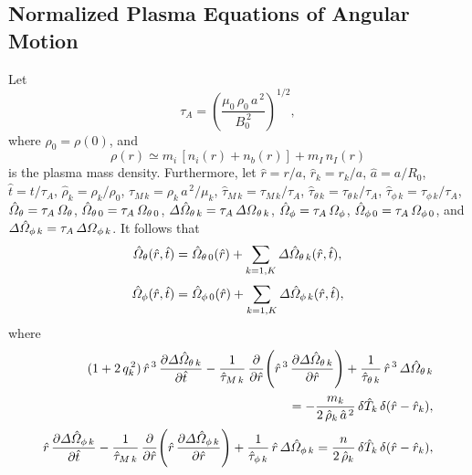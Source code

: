 \documentclass[12pt]{article}
\begin{document}
\subsection{Normalized Plasma Equations of Angular Motion}
Let 
\begin{equation}
\tau_A = \left(\frac{\mu_0\,\rho_0\,a^{\,2}}{B_0^{\,2}}\right)^{1/2},
\end{equation}
where
 $\rho_0=\rho(0)$,
 and
\begin{equation}
\rho(r)
\simeq  m_i\,[n_i(r)+n_b(r)] + m_I\,n_I(r)
\end{equation}
 is the plasma mass density.  
  Furthermore, let $\hat{r}=r/a$, $\hat{r}_k=r_k/a$, $\hat{a}=a/R_0$, $\hat{t}=t/\tau_A$, $\hat{\rho}_k=\rho_k/\rho_0$, $\tau_{M\,k} = \rho_k\,a^{\,2}/\mu_k$, $\hat{\tau}_{M\,k}= \tau_{M\,k}/\tau_A$, 
$\hat{\tau}_{\theta\,k}=\tau_{\theta\,k}/\tau_A$, $
\hat{\tau}_{\phi\,k}=\tau_{\phi\,k}/\tau_A$, $\hat{\mit\Omega}_\theta=\tau_A\,{\mit\Omega}_\theta$, $\hat{\mit\Omega}_{\theta\,0}=\tau_A\,{\mit\Omega}_{\theta\,0}$,
${\mit\Delta}\hat{\mit\Omega}_{\theta\,k} = \tau_A\,{\mit\Delta\Omega}_{\theta\,k}$, $\hat{\mit\Omega}_\phi=\tau_A\,{\mit\Omega}_\phi$, $\hat{\mit\Omega}_{\phi\,0}=\tau_A\,{\mit\Omega}_{\phi\,0}$,
and 
${\mit\Delta}\hat{\mit\Omega}_{\phi\,k} = \tau_A\,{\mit\Delta\Omega}_{\phi\,k}$. It follows that
\begin{align}
\hat{\mit\Omega}_\theta(\hat{r},\hat{t}) &=\hat{\mit\Omega}_{\theta\,0}(\hat{r}) + \sum_{k=1,K}{\mit\Delta}\hat{\mit\Omega}_{\theta\,k}(\hat{r},\hat{t}),\\[0.5ex]
\hat{\mit\Omega}_\phi(\hat{r},\hat{t}) &=\hat{\mit\Omega}_{\phi\,0}(\hat{r}) + \sum_{k=1,K}{\mit\Delta}\hat{\mit\Omega}_{\phi\,k}(\hat{r},\hat{t}),
\end{align}
where
\begin{align}
(1+2\,q_k^{\,2})\,\hat{r}^{\,3}\,\frac{\partial{\mit\Delta}\hat{\mit\Omega}_{\theta\,k}}{\partial \hat{t}}-\frac{1}{\hat{\tau}_{M\,k}}\,\frac{\partial}{\partial \hat{r}}\!\left(
\hat{r}^{\,3}\,\frac{\partial{\mit\Delta}\hat{\mit\Omega}_{\theta\,k}}{\partial \hat{r}}\right) +\frac{1}{\hat{\tau}_{\theta\,k}}\,\hat{r}^{\,3}\,{\mit\Delta}\hat{\mit\Omega}_{\theta\,k}\nonumber\\[0.5ex]\phantom{==}=-\frac{m_k}{2\,\hat{\rho}_k\,\hat{a}^{\,2}}\,\delta\hat{T}_k\,\delta (\hat{r}-\hat{r}_k),\label{exxx}\\[0.5ex]
\hat{r}\,\frac{\partial{\mit\Delta}\hat{\mit\Omega}_{\phi\,k}}{\partial \hat{t}}-\frac{1}{\hat{\tau}_{M\,k}}\,\frac{\partial}{\partial \hat{r}}\!\left(
\hat{r}\,\frac{\partial{\mit\Delta}\hat{\mit\Omega}_{\phi\,k}}{\partial \hat{r}}\right) +\frac{1}{\hat{\tau}_{\phi\,k}}\,\hat{r}\,{\mit\Delta}\hat{\mit\Omega}_{\phi\,k}
= \frac{n}{2\,\hat{\rho}_k}\,\delta \hat{T}_{k}\,\delta(\hat{r}-\hat{r}_k),\label{eyyy}
\end{align}
\end{document}
